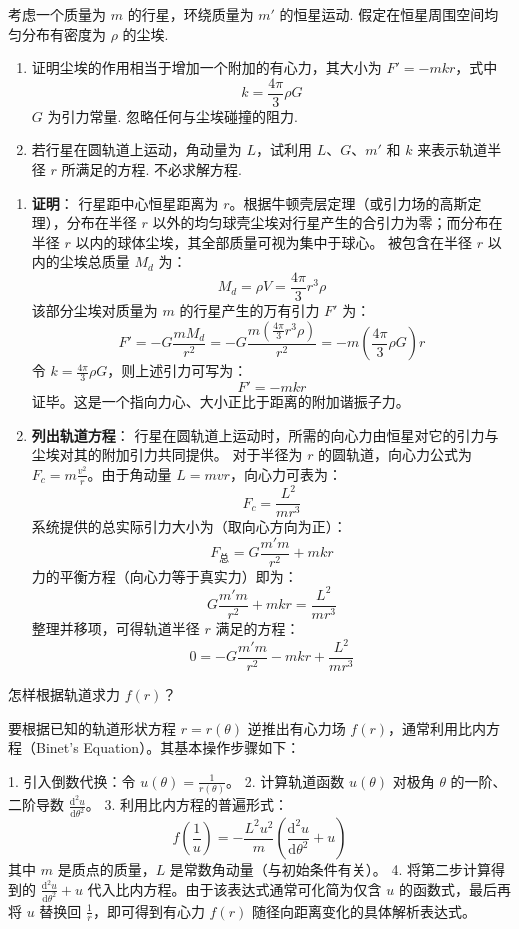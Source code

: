 \begin{exercise}\label{ex:4.15}
考虑一个质量为 $m$ 的行星，环绕质量为 $m'$ 的恒星运动. 假定在恒星周围空间均匀分布有密度为 $\rho$ 的尘埃.
\begin{enumerate}
  \item[(a)] 证明尘埃的作用相当于增加一个附加的有心力，其大小为 $F' = -mkr$，式中
  $$k = \frac{4\pi}{3}\rho G$$
  $G$ 为引力常量. 忽略任何与尘埃碰撞的阻力.
  \item[(b)] 若行星在圆轨道上运动，角动量为 $L$，试利用 $L$、$G$、$m'$ 和 $k$ 来表示轨道半径 $r$ 所满足的方程. 不必求解方程.
\end{enumerate}
\end{exercise}
\begin{solution}
\begin{enumerate}
    \item[(a)] \textbf{证明}：
    行星距中心恒星距离为 $r$。根据牛顿壳层定理（或引力场的高斯定理），分布在半径 $r$ 以外的均匀球壳尘埃对行星产生的合引力为零；而分布在半径 $r$ 以内的球体尘埃，其全部质量可视为集中于球心。
    被包含在半径 $r$ 以内的尘埃总质量 $M_d$ 为：
    $$ M_d = \rho V = \frac{4\pi}{3} r^3 \rho $$
    该部分尘埃对质量为 $m$ 的行星产生的万有引力 $F'$ 为：
    $$ F' = -G \frac{m M_d}{r^2} = -G \frac{m \left( \frac{4\pi}{3} r^3 \rho \right)}{r^2} = -m \left( \frac{4\pi}{3} \rho G \right) r $$
    令 $k = \frac{4\pi}{3}\rho G$，则上述引力可写为：
    $$ F' = -mkr $$
    证毕。这是一个指向力心、大小正比于距离的附加谐振子力。

    \item[(b)] \textbf{列出轨道方程}：
    行星在圆轨道上运动时，所需的向心力由恒星对它的引力与尘埃对其的附加引力共同提供。
    对于半径为 $r$ 的圆轨道，向心力公式为 $F_c = m \frac{v^2}{r}$。由于角动量 $L = mvr$，向心力可表为：
    $$ F_c = \frac{L^2}{m r^3} $$
    系统提供的总实际引力大小为（取向心方向为正）：
    $$ F_{\text{总}} = G\frac{m' m}{r^2} + mkr $$
    力的平衡方程（向心力等于真实力）即为：
    $$ G\frac{m' m}{r^2} + mkr = \frac{L^2}{m r^3} $$
    整理并移项，可得轨道半径 $r$ 满足的方程：
    $$ 0 = -G\frac{m' m}{r^2} - mkr + \frac{L^2}{m r^3} $$
\end{enumerate}
\end{solution}

\begin{exercise}\label{ex:4.16}
怎样根据轨道求力 $f(r)$？
\end{exercise}
\begin{solution}
要根据已知的轨道形状方程 $r = r(\theta)$ 逆推出有心力场 $f(r)$，通常利用比内方程（Binet's Equation）。其基本操作步骤如下：

1. 引入倒数代换：令 $u(\theta) = \frac{1}{r(\theta)}$。
2. 计算轨道函数 $u(\theta)$ 对极角 $\theta$ 的一阶、二阶导数 $\frac{\mathrm{d}^2 u}{\mathrm{d}\theta^2}$。
3. 利用比内方程的普遍形式：
$$ f\left(\frac{1}{u}\right) = - \frac{L^2 u^2}{m} \left( \frac{\mathrm{d}^2 u}{\mathrm{d}\theta^2} + u \right) $$
其中 $m$ 是质点的质量，$L$ 是常数角动量（与初始条件有关）。
4. 将第二步计算得到的 $\frac{\mathrm{d}^2 u}{\mathrm{d}\theta^2} + u$ 代入比内方程。由于该表达式通常可化简为仅含 $u$ 的函数式，最后再将 $u$ 替换回 $\frac{1}{r}$，即可得到有心力 $f(r)$ 随径向距离变化的具体解析表达式。
\end{solution}

